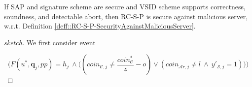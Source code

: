 
 \begin{lemma}\label{lem::RC-S-P-SecurityAgainstMaliciousServer}
 If SAP and signature scheme are secure and  VSID scheme supports correctness, soundness, and detectable abort, then RC-S-P is secure against malicious server, w.r.t. Definition \ref{deff::RC-S-P-SecurityAgainstMaliciousServer}. 
 \end{lemma}
 

 \begin{proof}[sketch]
 We first consider event  
 
  $$\Bigg(F(u^{\scriptscriptstyle *}, \bm{q}_{\scriptscriptstyle j},{pp})= h_{\scriptscriptstyle j}\ \wedge \Big((coin_{\scriptscriptstyle\mathcal{C},j}\neq  \frac{coin_{\scriptscriptstyle\mathcal C}^{\scriptscriptstyle*}}{z}-o)  \vee (coin_{\scriptscriptstyle\mathcal{A}r,j}\neq l\ \wedge\  y'_{\scriptscriptstyle \mathcal {S},j}=1)\Big)\Bigg)$$

\end{proof}
